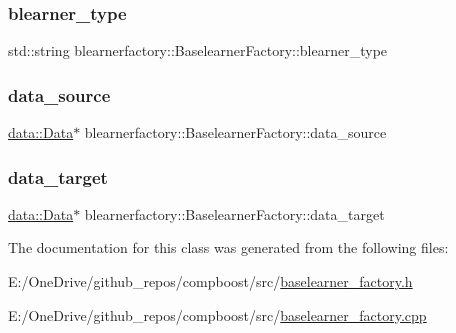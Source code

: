 \subsubsection{\texorpdfstring{blearner\+\_\+type}{blearner\_type}}
{\footnotesize\ttfamily std\+::string blearnerfactory\+::\+Baselearner\+Factory\+::blearner\+\_\+type\hspace{0.3cm}{\ttfamily [protected]}}

\mbox{\label{classblearnerfactory_1_1_baselearner_factory_a6194191695958b4035d3ea0841c2320c}} 
\subsubsection{\texorpdfstring{data\+\_\+source}{data\_source}}
{\footnotesize\ttfamily \mbox{\hyperlink{classdata_1_1_data}{data\+::\+Data}}$\ast$ blearnerfactory\+::\+Baselearner\+Factory\+::data\+\_\+source\hspace{0.3cm}{\ttfamily [protected]}}

\mbox{\label{classblearnerfactory_1_1_baselearner_factory_af2cb5c226c90469c6a70b677214ecc2f}} 
\subsubsection{\texorpdfstring{data\+\_\+target}{data\_target}}
{\footnotesize\ttfamily \mbox{\hyperlink{classdata_1_1_data}{data\+::\+Data}}$\ast$ blearnerfactory\+::\+Baselearner\+Factory\+::data\+\_\+target\hspace{0.3cm}{\ttfamily [protected]}}



The documentation for this class was generated from the following files\+:\begin{DoxyCompactItemize}
\item 
E\+:/\+One\+Drive/github\+\_\+repos/compboost/src/\mbox{\hyperlink{baselearner__factory_8h}{baselearner\+\_\+factory.\+h}}\item 
E\+:/\+One\+Drive/github\+\_\+repos/compboost/src/\mbox{\hyperlink{baselearner__factory_8cpp}{baselearner\+\_\+factory.\+cpp}}\end{DoxyCompactItemize}
